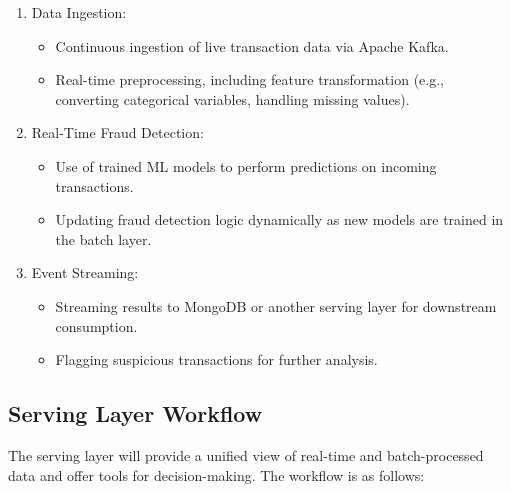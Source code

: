 \documentclass[12pt,a4paper, hidelinks]{article}
\begin{document}
\begin{enumerate}
    \item Data Ingestion:
        \begin{itemize}
            \item Continuous ingestion of live transaction data via Apache Kafka.
            \item Real-time preprocessing, including feature transformation (e.g., converting categorical variables, handling missing values).
        \end{itemize}
    \item Real-Time Fraud Detection:
        \begin{itemize}
            \item Use of trained ML models to perform predictions on incoming transactions.
            \item Updating fraud detection logic dynamically as new models are trained in the batch layer.
        \end{itemize}
    \item Event Streaming:
        \begin{itemize}
            \item Streaming results to MongoDB or another serving layer for downstream consumption.
            \item Flagging suspicious transactions for further analysis.
        \end{itemize}
\end{enumerate}

\subsection{Serving Layer Workflow}
The serving layer will provide a unified view of real-time and batch-processed data and offer tools for decision-making. The workflow is as follows:
\end{document}
